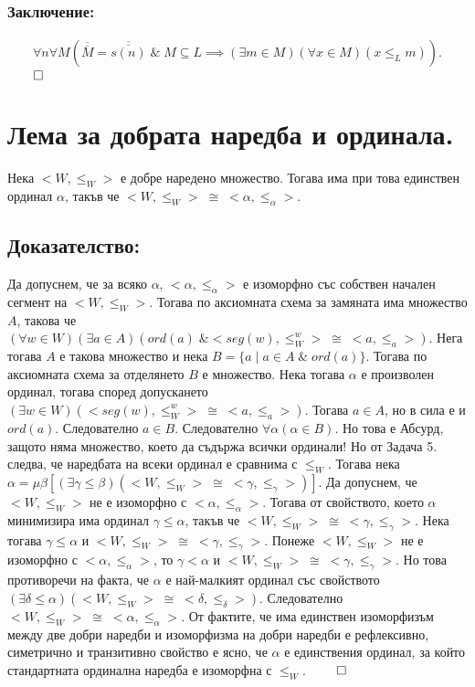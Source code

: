 \documentclass[12pt]{article}
\begin{document}
\subsubsection*{Заключение:}
\begin{align*}
\forall n \forall M (\overline{\overline{M}} = \overline{\overline{s(n)}} \; \& \; M \subseteq L \implies (\exists m \in M)(\forall x \in M)(x \leq_L m)).
\end{align*} \(\qed\)

\section*{Лема за добрата наредба и ординала.}
Нека \(<W, \leq_W>\) е добре наредено множество.
Тогава има при това единствен ординал \(\alpha\),
такъв че \(<W, \leq_W> \; \cong \; <\alpha, \leq_\alpha>\).

\subsection*{Доказателство:}
Да допуснем, че за всяко \(\alpha\), \(<\alpha, \leq_\alpha>\) е изоморфно със собствен начален сегмент на \(<W, \leq_W>\). Тогава по аксиомната схема за замяната има множество
\(A\), такова че \\
\((\forall w \in W)(\exists a \in A)(ord(a) \; \& <seg(w), \leq_W^w> \; \cong \; <a, \leq_a>)\).
Нега тогава \(A\) е такова множество и нека \(B = \{a \; | \; a \in A \; \& \; ord(a)\}\). Тогава по аксиомната схема за отделянето \(B\) е множество.
Нека тогава \(\alpha\) е произволен ординал, тогава според допускането
\((\exists w \in W)(<seg(w), \leq_W^w> \; \cong \; <a, \leq_a>)\).
Тогава \(a \in A\), но в сила е и \(ord(a)\).
Следователно \(a \in B\).
Следователно \(\forall \alpha (\alpha \in B)\). Но това е Абсурд, защото няма множество,
което да съдържа всички ординали!
Но от Задача 5. следва, че наредбата на всеки ординал е сравнима с \(\leq_W\).
Тогава нека \\
\(\alpha = \mu\beta[(\exists \gamma \leq \beta)(<W, \leq_W> \; \cong \; <\gamma, \leq_\gamma>)]\). Да допуснем, че \(<W, \leq_W>\) не е изоморфно с \(<\alpha, \leq_\alpha>\). Тогава от свойството, което \(\alpha\) минимизира има ординал
\(\gamma \leq \alpha\), такъв че \(<W, \leq_W> \; \cong \; <\gamma, \leq_\gamma>\).
Нека тогава \(\gamma \leq \alpha\) и \(<W, \leq_W> \; \cong \; <\gamma, \leq_\gamma>\).
Понеже \(<W, \leq_W>\) не е изоморфно с \(<\alpha, \leq_\alpha>\), то \(\gamma < \alpha\)
и \(<W, \leq_W> \; \cong \; <\gamma, \leq_\gamma>\). Но това противоречи на факта,
че \(\alpha\) е най-малкият ординал със свойството \((\exists \delta \leq \alpha)(<W, \leq_W> \; \cong \; <\delta, \leq_\delta>)\).
Следователно \(<W, \leq_W> \; \cong \; <\alpha, \leq_\alpha>\).
От фактите, че има единствен изоморфизъм между две добри наредби и изоморфизма на добри наредби е рефлексивно, симетрично и транзитивно свойство е ясно, че \(\alpha\) е единствения ординал, за който стандартната ординална наредба е изоморфна с \(\leq_W\). \(\qed\)
\end{document}
